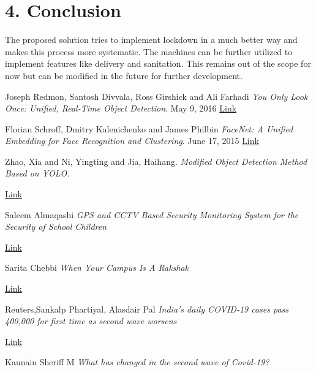 \documentclass[eng]{FCEFyN-class}
\begin{document}
\section{4. Conclusion}

The proposed solution tries to implement lockdown in a much better way and makes this process more systematic. The machines can be further utilized to implement features like delivery and sanitation. This remains out of the scope for now but can be modified in the future for further development. 

\vspace{4cm}
\appendix

\begin{thebibliography}{9}

Joseph Redmon, Santosh Divvala, Ross Girshick and Ali Farhadi
\textit{You Only Look Once:
Unified, Real-Time Object Detection}. 
May 9, 2016
\href{https://arxiv.org/pdf/1503.03832.pdf}{Link}

Florian Schroff, Dmitry Kalenichenko and James Philbin
\textit{FaceNet: A Unified Embedding for Face Recognition and Clustering}. 
June 17, 2015
\href{https://arxiv.org/pdf/1503.03832.pdf}{Link}



Zhao, Xia and Ni, Yingting and Jia, Haihang.
\textit{Modified Object Detection Method Based on YOLO.} 

\href{https://www.sciencedirect.com/science/article/pii/S1110016818301091#!}{Link}


Saleem Almaqashi
\textit{GPS and CCTV Based Security Monitoring System for the Security of School Children}

\href{https://www.researchgate.net/publication/334730218_GPS_and_CCTV_Based_Security_Monitoring_System_for_the_Security_of_School_Children}{Link}

Sarita Chebbi
\textit{When Your Campus Is A Rakshak}

\href{https://blogs.iiit.ac.in/gocoronago/}{Link}

Reuters,Sankalp Phartiyal, Alasdair Pal
\textit{India’s daily COVID-19 cases pass 400,000 for first time as second wave worsens}

\href{https://www.reuters.com/world/asia-pacific/india-posts-record-daily-rise-covid-19-cases-401993-2021-05-01/}{Link}

 Kaunain Sheriff M 
\textit{What has changed in the second wave of Covid-19?}


\end{thebibliography}
\end{document}
